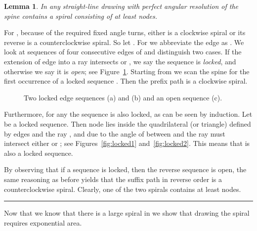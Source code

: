 \documentclass[11pt]{article}
\newtheorem{lemma}{Lemma}
\newcommand{\qed}{\hspace*{\fill}\rule{6pt}{6pt}}
\newenvironment{proof}{\noindent{\bf Proof:}}{\bigskip} \makeatletter
\begin{document}
\begin{lemma}\label{lem:spiral}
	In any straight-line drawing with perfect angular resolution of  the spine  contains a spiral consisting of at least  nodes.
\end{lemma}
\begin{proof}
	For ,  because of the required fixed angle turns, either  is a clockwise spiral or its reverse  is a counterclockwise spiral.
	So let . 
	For  we abbreviate the edge  as . 
	We look at sequences  of four consecutive edges  of  and distinguish two cases.
	If the extension of edge  into a ray  intersects  or , we say the sequence  is \emph{locked}, and otherwise we say it is \emph{open}; see Figure~\ref{fig:spiral-locked-open}.
	Starting from  we scan the spine  for the first occurrence  of a locked sequence . 
	Then the prefix path  is a clockwise spiral.
		
	\begin{figure}[htbp]
		\centering
		\hfill
		\hfill
		\caption{Two locked edge sequences (a) and (b) and an open sequence (c).}
		\label{fig:spiral-locked-open}
	\end{figure}
	
	
	Furthermore, for any  the sequence  is also locked, as can be seen by induction.
	Let  be a locked sequence. 
	Then node  lies inside the quadrilateral (or triangle) defined by edges  and the ray , and due to the angle of  between  and  the ray   must intersect either  or ; see Figures~\ref{fig:locked1} and~\ref{fig:locked2}.
	This means that  is also a locked sequence.
	
	By observing that if a sequence  is locked, then the reverse sequence  is open, the same reasoning as before yields that the suffix path  in reverse order  is a counterclockwise spiral. Clearly, one of the two spirals contains at least  nodes. \qed
\end{proof}

Now that we know that there is a large spiral in  we show that drawing the spiral requires exponential area.
\end{document}
